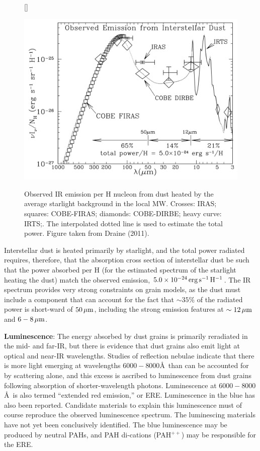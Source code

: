 \documentclass[a4paper,10pt]{article}
\begin{document}
\begin{figure}[t]
    [\FBwidth]
    {\caption{\footnotesize{Observed IR emission per H nucleon from dust heated by the average starlight background in the local MW. Crosses: IRAS; squares: COBE-FIRAS; diamonds: COBE-DIRBE; heavy curve: IRTS;. The interpolated dotted line is used to estimate the total power. Figure taken from Draine (2011).}}
    \label{fig:dustir}}
    {\includegraphics[width=12cm]{figures/dustIR.png}}
\end{figure}

{\noindent}Interstellar dust is heated primarily by starlight, and the total power radiated requires, therefore, that the absorption cross section of interstellar dust be such that the power absorbed per H (for the estimated spectrum of the starlight heating the dust) match the observed emission, $5.0\times10^{-24}\,{\rm erg\,s^{-1}\,H^{-1}}$. The IR spectrum provides very strong constraints on grain models, as the dust must include a component that can account for the fact that $\sim35\%$ of the radiated power is short-ward of $50\,\mu{\rm m}$, including the strong emission features at $\sim12\,\mu{\rm m}$ and $6-8\,\mu{\rm m}$.

{\noindent}\textbf{Luminescence}: The energy absorbed by dust grains is primarily reradiated in the mid- and far-IR, but there is evidence that dust grains also emit light at optical and near-IR wavelengths. Studies of reflection nebulae indicate that there is more light emerging at wavelengths $6000-8000$\AA~than can be accounted for by scattering alone, and this excess is ascribed to luminescence from dust grains following absorption of shorter-wavelength photons. Luminescence at $6000-8000$\AA~is also termed ``extended red emission,'' or ERE. Luminescence in the blue has also been reported. Candidate materials to explain this luminescence must of course reproduce the observed luminescence spectrum. The luminescing materials have not yet been conclusively identified. The blue luminescence may be produced by neutral PAHs, and PAH di-cations (PAH$^{++}$) may be responsible for the ERE.
\end{document}
